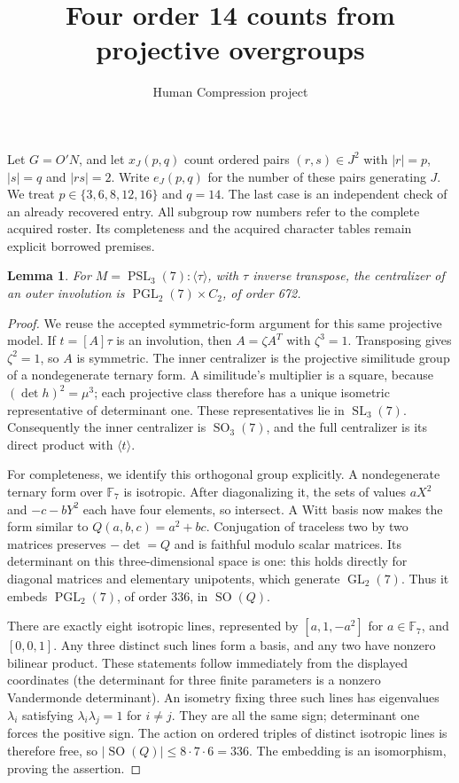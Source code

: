 \documentclass[11pt,a4paper]{article}
\title{Four order 14 counts from projective overgroups}
\author{Human Compression project}\date{}
\newtheorem{lemma}{Lemma}\newtheorem{theorem}{Theorem}
\begin{document}
\maketitle
Let $G=O'N$, and let $x_J(p,q)$ count ordered pairs $(r,s)\in J^2$
with $|r|=p$, $|s|=q$ and $|rs|=2$. Write $e_J(p,q)$ for the
number of these pairs generating $J$. We treat
$p\in\{3,6,8,12,16\}$ and $q=14$. The last case is an independent
check of an already recovered entry. All subgroup row numbers refer
to the complete acquired roster. Its completeness and the acquired
character tables remain explicit borrowed premises.

\begin{lemma}\label{orthogonal}
For $M=\operatorname{PSL}_3(7):\langle\tau\rangle$, with $\tau$
inverse transpose, the centralizer of an outer involution is
$\operatorname{PGL}_2(7)\times C_2$, of order 672.
\end{lemma}
\begin{proof}
We reuse the accepted symmetric-form argument for this same
projective model. If $t=[A]\tau$ is an involution, then
$A=\zeta A^T$ with $\zeta^3=1$. Transposing gives $\zeta^2=1$,
so $A$ is symmetric. The inner centralizer is the projective
similitude group of a nondegenerate ternary form. A similitude's
multiplier is a square, because $(\det h)^2=\mu^3$; each projective
class therefore has a unique isometric representative of determinant
one. These representatives lie in $\operatorname{SL}_3(7)$.
Consequently the inner centralizer is $\operatorname{SO}_3(7)$,
and the full centralizer is its direct product with $\langle t\rangle$.

For completeness, we identify this orthogonal group explicitly.
A nondegenerate ternary form over $\mathbb F_7$ is isotropic.
After diagonalizing it, the sets of values $aX^2$ and $-c-bY^2$
each have four elements, so intersect. A Witt basis now makes
the form similar to $Q(a,b,c)=a^2+bc$. Conjugation of traceless
two by two matrices preserves $-\det=Q$ and is faithful modulo
scalar matrices. Its determinant on this three-dimensional space
is one: this holds directly for diagonal matrices and elementary
unipotents, which generate $\operatorname{GL}_2(7)$. Thus it embeds
$\operatorname{PGL}_2(7)$, of order 336, in $\operatorname{SO}(Q)$.

There are exactly eight isotropic lines, represented by
$[a,1,-a^2]$ for $a\in\mathbb F_7$, and $[0,0,1]$.
Any three distinct such lines form a basis, and any two have
nonzero bilinear product. These statements follow immediately
from the displayed coordinates (the determinant for three finite
parameters is a nonzero Vandermonde determinant).
An isometry fixing three such lines has eigenvalues $\lambda_i$
satisfying $\lambda_i\lambda_j=1$ for $i\ne j$. They are all the
same sign; determinant one forces the positive sign. The action
on ordered triples of distinct isotropic lines is therefore free,
so $|\operatorname{SO}(Q)|\leq8\cdot7\cdot6=336$.
The embedding is an isomorphism, proving the assertion.
\end{proof}
\end{document}
